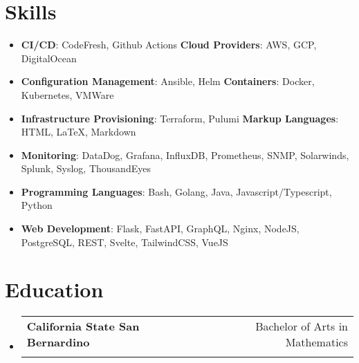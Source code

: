 \documentclass[letterpaper,11pt]{article}
\makeatletter
\newcommand{\technicalItem}[1]{
  \item\small{
    {#1 \vspace{-.75em}}
  }
}
\newcommand{\resumeSubheading}[4]{
  \vspace{-1pt}\item
    \begin{tabular*}{0.97\textwidth}[t]{l@{\extracolsep{\fill}}r}
      \textbf{#1} & #2 \\
      \textit{\small#3} & \textit{\small #4} \\
    \end{tabular*}\vspace{-5pt}
}
\newcommand{\resumeSubHeadingListStart}{\begin{itemize}[leftmargin=*]}
\newcommand{\resumeSubHeadingListEnd}{\end{itemize}}
\makeatother
\begin{document}
\section{Skills}
 \resumeSubHeadingListStart
  \technicalItem{
    \textbf{CI/CD}{: CodeFresh, Github Actions}
    \hfill
    \textbf{Cloud Providers}{: AWS, GCP, DigitalOcean}
  }
  \technicalItem{
    \textbf{Configuration Management}{: Ansible, Helm}
    \hfill
    \textbf{Containers}{: Docker, Kubernetes, VMWare}
  }
  \technicalItem{
    \textbf{Infrastructure Provisioning}{: Terraform, Pulumi}
    \hfill
    \textbf{Markup Languages}{: HTML, {\LaTeX}, Markdown}
  }
  \technicalItem{
    \textbf{Monitoring}{: DataDog, Grafana, InfluxDB, Prometheus, SNMP, Solarwinds, Splunk, Syslog, ThousandEyes}
  }
  \technicalItem{
    \textbf{Programming Languages}{: Bash, Golang, Java, Javascript/Typescript, Python}
  }
  \technicalItem{
    \textbf{Web Development}{: Flask, FastAPI, GraphQL, Nginx, NodeJS, PostgreSQL, REST, Svelte, TailwindCSS, VueJS}
  }
 \resumeSubHeadingListEnd

\section{Education}
  \resumeSubHeadingListStart
    \resumeSubheading
      {California State San Bernardino}{Bachelor of Arts in Mathematics}
      {}{}
  \resumeSubHeadingListEnd

\end{document}
